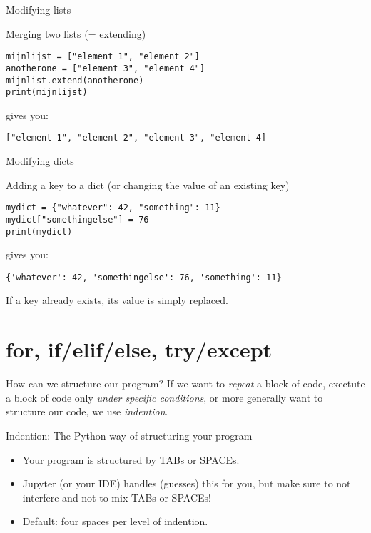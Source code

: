 \begin{frame}[fragile]{Modifying lists}
\begin{block}{Merging two lists (= extending)}
\begin{verbatim}
mijnlijst = ["element 1", "element 2"]
anotherone = ["element 3", "element 4"]
mijnlist.extend(anotherone)
print(mijnlijst)
\end{verbatim}
gives you:
\begin{verbatim}
["element 1", "element 2", "element 3", "element 4]
\end{verbatim}
\end{block}
\end{frame}




\begin{frame}[fragile]{Modifying dicts}
\begin{block}{Adding a key to a dict (or changing the value of an existing key)}
\begin{verbatim}
mydict = {"whatever": 42, "something": 11}
mydict["somethingelse"] = 76
print(mydict)
\end{verbatim}
gives you:
\begin{verbatim}
{'whatever': 42, 'somethingelse': 76, 'something': 11}
\end{verbatim}
If a key already exists, its value is simply replaced.
\end{block}
\end{frame}




\section{for, if/elif/else, try/except}

\begin{frame}[fragile]{How can we structure our program?}
If we want to \emph{repeat} a block of code, exectute a block of code only \emph{under specific conditions}, or more generally want to structure our code, we use \emph{indention}.

	\begin{block}{Indention: The Python way of structuring your program}
		\begin{itemize}
			\item Your program is structured by TABs or SPACEs.
			\item Jupyter (or your IDE) handles (guesses) this for you, but make sure to not interfere and not to mix TABs or SPACEs!
			\item Default: four spaces per level of indention.
		\end{itemize}
	\end{block}
\end{frame}



